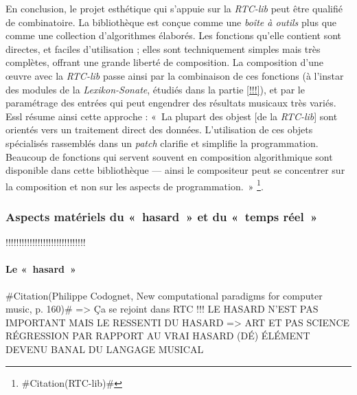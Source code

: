 \documentclass[a4paper,12pt]{article}
\newcommand{\guill}[1]{«~#1~»}
\newcommand{\zitat}[2]{\#Citation(#2)\#}
\begin{document}
En conclusion, le projet esthétique qui s'appuie sur la \emph{RTC-lib} peut être qualifié de combinatoire. La bibliothèque est conçue comme une \emph{boîte à outils} plus que comme une collection d'algorithmes élaborés. Les fonctions qu'elle contient sont directes, et faciles d'utilisation ; elles sont techniquement simples mais très complètes, offrant une grande liberté de composition. La composition d'une œuvre avec la \emph{RTC-lib} passe ainsi par la combinaison de ces fonctions (à l'instar des modules de la \emph{Lexikon-Sonate}, étudiés dans la partie \ref{!!!}), et par le paramétrage des entrées qui peut engendrer des résultats musicaux très variés. Essl résume ainsi cette approche : \guill{La plupart des objest [de la \emph{RTC-lib}] sont orientés vers un traitement direct des données. L'utilisation de ces objets spécialisés rassemblés dans un \emph{patch} clarifie et simplifie la programmation. Beaucoup de fonctions qui servent souvent en composition algorithmique sont disponible dans cette bibliothèque --- ainsi le compositeur peut se concentrer sur la composition et non sur les aspects de programmation.}
\footnote{\zitat{Most of these objects are geared towards straightforward processing of data. By using these specialized objects together in a patch, programming becomes much more clear and easy. Many functions that are often useful in algorithmic composition are provided with this library --- therefore the composer could concentrate rather on the composition than the programming aspects.}
{RTC-lib}}.

\subsubsection{Aspects matériels du \guill{hasard} et du \guill{temps réel}}

!!!!!!!!!!!!!!!!!!!!!!!!!!!!!!

\paragraph{Le \guill{hasard} \\}

\zitat{It is interesting to note that we have with Cage two ways of using randomness for music composition. One, inhreited from Duchamp, is what can be called \emph{internal chance}: randomness is used at composition time to determine the score, which is then written and closed. The other can be called \emph{external chance}: the score is open to real-time chance operation and external perturbation. In that respect, \emph{4'33''} is certainly the best and minimal example of external chance.}
{Philippe Codognet, New computational paradigms for computer music, p. 160}
=> Ça se rejoint dans RTC !!!
LE HASARD N'EST PAS IMPORTANT MAIS LE RESSENTI DU HASARD => ART ET PAS SCIENCE
RÉGRESSION PAR RAPPORT AU VRAI HASARD (DÉ)
ÉLÉMENT DEVENU BANAL DU LANGAGE MUSICAL
\end{document}
